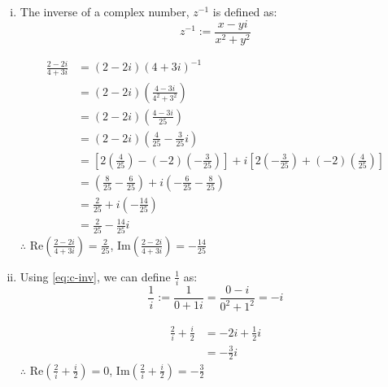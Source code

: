 \documentclass[a4paper, titlepage, DIV=14]{scrartcl}
\begin{document}
\begin{enumerate}
\begin{enumerate}[i)]
            \item The inverse of a complex number, $z^{-1}$ is defined as:
            \begin{equation}
                z^{-1} := \frac{x-yi}{x^{2}+y^{2}} \label{eq:c-inv}
            \end{equation}
            
            \begin{align*}
                \frac{2-2i}{4+3i} &= (2-2i)(4+3i)^{-1} \\
                                &= (2-2i)(\frac{4-3i}{4^{2}+3^{2}}) \\
                                &= (2-2i)(\frac{4-3i}{25}) \\
                                &= (2-2i)(\frac{4}{25} - \frac{3}{25}i) \\
                                &= [2(\frac{4}{25})-(-2)(-\frac{3}{25})] 
                                + i[2(-\frac{3}{25})+(-2)(\frac{4}{25})] \\
                                &= (\frac{8}{25}-\frac{6}{25}) + i (-\frac{6}{25}-\frac{8}{25}) \\
                                &= \frac{2}{25} + i(-\frac{14}{25}) \\
                                &= \frac{2}{25} - \frac{14}{25}i
            \end{align*}
            $\therefore$ Re$(\frac{2-2i}{4+3i})=\frac{2}{25}$, 
                Im$(\frac{2-2i}{4+3i})=- \frac{14}{25}$ \\

            \item Using \autoref{eq:c-inv}, we can define $\frac{1}{i}$ as:
            \begin{equation}
                \frac{1}{i} := \frac{1}{0+1i} = \frac{0 - i}{0^{2}+1^{2}} = -i \label{eq:i-1} 
            \end{equation}

            \begin{align*}
                \frac{2}{i} + \frac{i}{2} &= -2i + \frac{1}{2}i \\
                                        &= -\frac{3}{2}i 
            \end{align*}
            $\therefore$ Re$(\frac{2}{i} + \frac{i}{2})=0$, 
                Im$(\frac{2}{i} + \frac{i}{2})= -\frac{3}{2}$ \\
            

\end{enumerate}
\end{enumerate}
\end{document}
